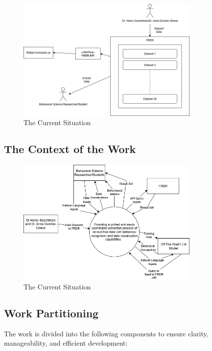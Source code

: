 \documentclass[12pt]{article}
\begin{document}
\begin{figure}[H]
    \centering
    \includegraphics[width=0.8\textwidth]{6.1 Current Situation.png}
    \caption{The Current Situation}
    \label{fig:myimage}
\end{figure}


\subsection{The Context of the Work}

\begin{figure}[H]
    \centering
    \includegraphics[width=0.8\textwidth]{6.2 Context of the Work.png}
    \caption{The Current Situation}
    \label{fig:myimage}
\end{figure}

\subsection{Work Partitioning}

The work is divided into the following components to ensure clarity, manageability, and efficient development:
\end{document}
